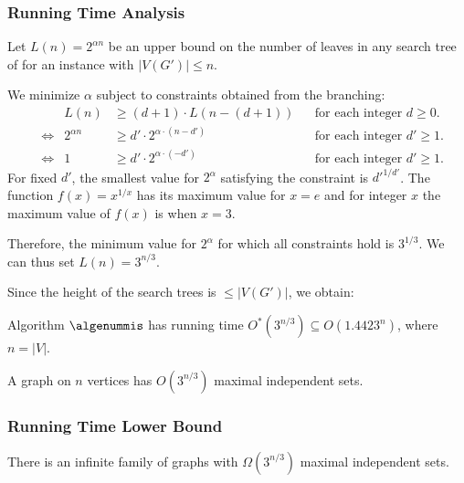 \begin{frame}
	\frametitle{Running Time Analysis}
	
	Let $L(n)=2^{\alpha n}$ be an upper bound on the number of leaves in any search tree of \algenummis for an instance with $|V(G')|\le n$.
	
	\medskip
	\noindent
	We minimize $\alpha$ subject to constraints obtained from the branching:
	\begin{align*}
	&&L(n) &\ge (d+1) \cdot L(n - (d+1)) && \text{for each integer $d\ge 0$.}\\
	&\Leftrightarrow& 2^{\alpha n} &\ge d' \cdot 2^{\alpha \cdot (n-d')} && \text{for each integer $d'\ge 1$.}\\
	&\Leftrightarrow& 1 &\ge d' \cdot 2^{\alpha \cdot (-d')} && \text{for each integer $d'\ge 1$.}
	\end{align*}
	\noindent
	For fixed $d'$, the smallest value for $2^\alpha$ satisfying the constraint is $d'^{1/d'}$. The function $f (x)=x^{1/x}$ has its maximum value for $x=e$ and for integer
	$x$ the maximum value of $f (x)$ is when $x = 3$.
	
	Therefore, the minimum value for $2^\alpha$ for which all constraints hold is $3^{1/3}$. We can thus set $L(n)=3^{n/3}$.
	
\end{frame}

\begin{frame}
 
 \lecturenotes{\medskip}
 \noindent
 Since the height of the search trees is $\le |V(G')|$, we obtain:
 
 \begin{theorem}
  Algorithm $\text{\algenummis}$ has running time $O^*(3^{n/3}) \subseteq O(1.4423^n)$, where $n=|V|$.
 \end{theorem}
 
 \begin{corollary}
  A graph on $n$ vertices has $O(3^{n/3})$ maximal independent sets.
 \end{corollary}
 
\end{frame}



\begin{frame}
 \frametitle{Running Time Lower Bound}
 
  \begin{center}
  \end{center}
  
  \begin{theorem}
   There is an infinite family of graphs with $\Omega(3^{n/3})$ maximal independent sets.
  \end{theorem}

\end{frame}


